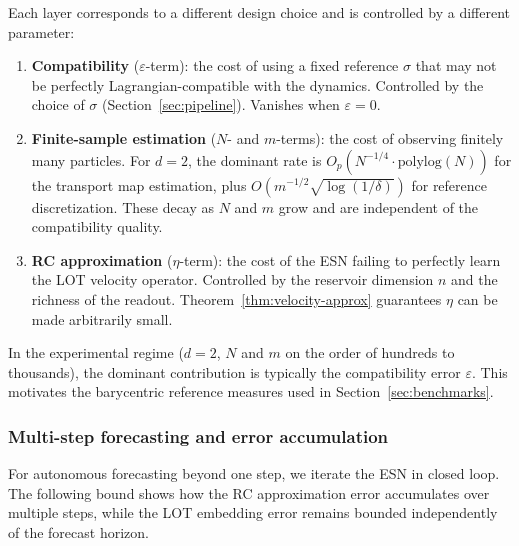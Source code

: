 \documentclass[11pt]{article}
\newcommand{\1}{\mathbf{1}}
\begin{document}
\begin{remark}\label{rmk:three-layers}
Each layer corresponds to a different design choice and is controlled by a different parameter:
\begin{enumerate}[label=(\alph*)]
  \item \textbf{Compatibility} ($\varepsilon$-term): the cost of using a
        fixed reference $\sigma$ that may not be perfectly
        Lagrangian-compatible with the dynamics. Controlled by the choice
        of $\sigma$ (Section~\ref{sec:pipeline}). Vanishes when
        $\varepsilon = 0$.
  \item \textbf{Finite-sample estimation} ($N$- and $m$-terms): the cost
        of observing finitely many particles. For $d = 2$, the dominant
        rate is $O_p(N^{-1/4} \cdot \mathrm{polylog}(N))$ for the
        transport map estimation, plus
        $O(m^{-1/2}\sqrt{\log(1/\delta)})$ for reference discretization.
        These decay as $N$ and $m$ grow and are independent of the
        compatibility quality.
  \item \textbf{RC approximation} ($\eta$-term): the cost of the ESN
        failing to perfectly learn the LOT velocity operator. Controlled by
        the reservoir dimension $n$ and the richness of the readout.
        Theorem~\ref{thm:velocity-approx} guarantees $\eta$ can be made
        arbitrarily small.
\end{enumerate}
In the experimental regime ($d = 2$, $N$ and $m$ on the order of hundreds
to thousands), the dominant contribution is typically the compatibility
error $\varepsilon$. This motivates the barycentric reference measures used
in Section~\ref{sec:benchmarks}.
\end{remark}

\subsubsection{Multi-step forecasting and error accumulation}
\label{sec:multistep}

For autonomous forecasting beyond one step, we iterate the ESN in closed
loop. The following bound shows how the RC approximation error accumulates over multiple steps, while the LOT embedding error remains bounded independently of the forecast horizon.
\end{document}

